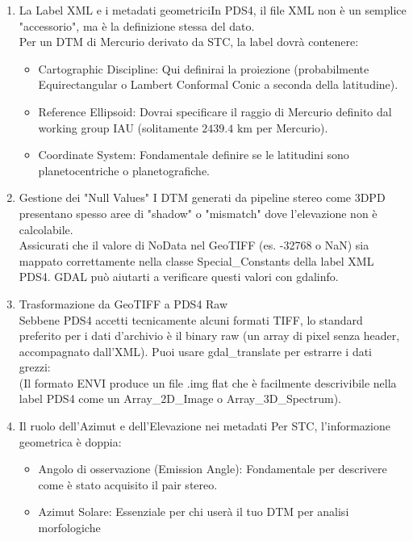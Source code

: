 \documentclass[a4paper,14pt]{article}
\begin{document}
\begin{enumerate}
\item La Label XML e i metadati geometriciIn PDS4, il file XML non è un semplice "accessorio", ma è la definizione stessa del dato.\\
Per un DTM di Mercurio derivato da STC, la label dovrà contenere:\\
\begin{itemize}
\item Cartographic Discipline: Qui definirai la proiezione (probabilmente Equirectangular o Lambert Conformal Conic a seconda della latitudine).\\
\item Reference Ellipsoid: Dovrai specificare il raggio di Mercurio definito dal working group IAU (solitamente \(2439.4\text{\ km}\) per Mercurio).\\
\item Coordinate System: Fondamentale definire se le latitudini sono planetocentriche o planetografiche.\\
\end{itemize}
\item Gestione dei "Null Values"
I DTM generati da pipeline stereo come 3DPD presentano spesso aree di "shadow" o "mismatch" dove l'elevazione non è calcolabile.\\
Assicurati che il valore di NoData nel GeoTIFF (es. -32768 o NaN) sia mappato correttamente nella classe Special\_Constants della label XML PDS4. GDAL può aiutarti a verificare questi valori con gdalinfo.\\
\item Trasformazione da GeoTIFF a PDS4 Raw\\
Sebbene PDS4 accetti tecnicamente alcuni formati TIFF, lo standard preferito per i dati d'archivio è il binary raw (un array di pixel senza header, accompagnato dall'XML).
Puoi usare gdal\_translate per estrarre i dati grezzi:\\
(Il formato ENVI produce un file .img flat che è facilmente descrivibile nella label PDS4 come un Array\_2D\_Image o Array\_3D\_Spectrum).\\
\item Il ruolo dell'Azimut e dell'Elevazione nei metadati
Per STC, l'informazione geometrica è doppia:
\begin{itemize}
\item Angolo di osservazione (Emission Angle): Fondamentale per descrivere come è stato acquisito il pair stereo.
\item Azimut Solare: Essenziale per chi userà il tuo DTM per analisi morfologiche

\end{itemize}
\end{enumerate}
\end{document}
